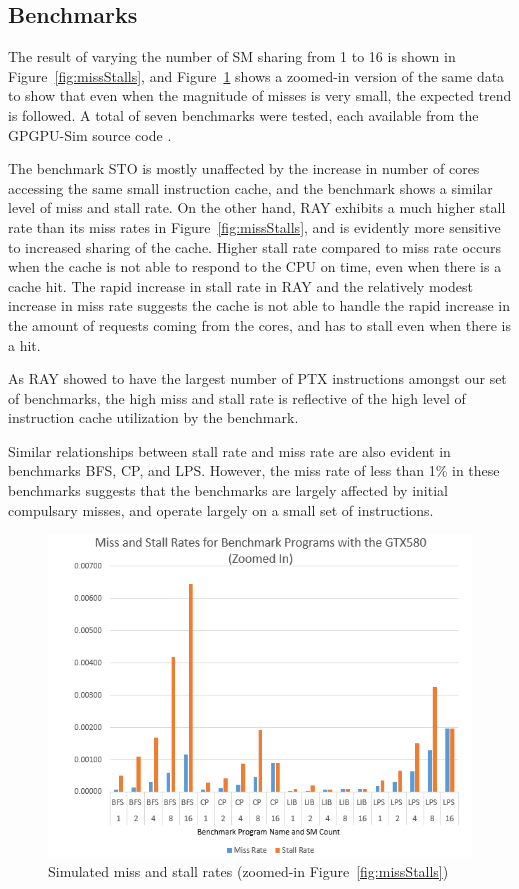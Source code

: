\subsection{Benchmarks}
\label{sec:benchmarks}
The result of varying the number of SM sharing from 1 to 16 is shown in 
Figure~\ref{fig:missStalls}, and Figure~\ref{fig:missStallsZoomed} shows 
a zoomed-in version of the same data to show that even when the magnitude 
of misses is very small, the expected trend is followed. 
A total of seven benchmarks were
tested, each available from the GPGPU-Sim source code \cite{bakhodayuan09}.

The benchmark STO is mostly unaffected by the increase in number of cores
accessing the same small instruction cache, and the benchmark shows a similar
level of miss and stall rate. 
On the other hand, RAY exhibits a much higher stall rate than its miss rates in Figure~\ref{fig:missStalls}, 
and is evidently more sensitive to increased sharing of the cache.
Higher stall rate compared to miss rate occurs when the cache is not able to 
respond to the CPU on time, even when there is a cache hit.
The rapid increase in stall rate in RAY and the relatively modest increase in miss rate 
suggests the cache is not able to handle the rapid increase in the amount of requests coming from the cores,
and has to stall even when there is a hit.

As RAY showed to have the largest number of PTX instructions amongst our set of benchmarks,
the high miss and stall rate is reflective of the high level of instruction cache utilization
by the benchmark. 

Similar relationships between stall rate and miss rate are also evident in 
benchmarks BFS, CP, and LPS. However, the miss rate of less than 1\% in these benchmarks
suggests that the benchmarks are largely affected by initial compulsary misses, and operate
largely on a small set of instructions.

\begin{figure}
\centering
\includegraphics[width=\columnwidth]{miss_stalls_benchmarks_zoomed.png}
\caption{Simulated miss and stall rates (zoomed-in Figure~\ref{fig:missStalls}) }
\label{fig:missStallsZoomed}
\end{figure}

